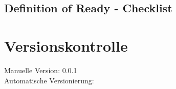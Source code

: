\documentclass[11pt,titelpage]{scrreprt}
\begin{document}
\subsection{Definition of Ready - Checklist}
\section{Versionskontrolle}
Manuelle Version: 0.0.1
\\

\noindent
Automatische Versionierung:
%

\immediate{}

\immediate{}
\end{document}

